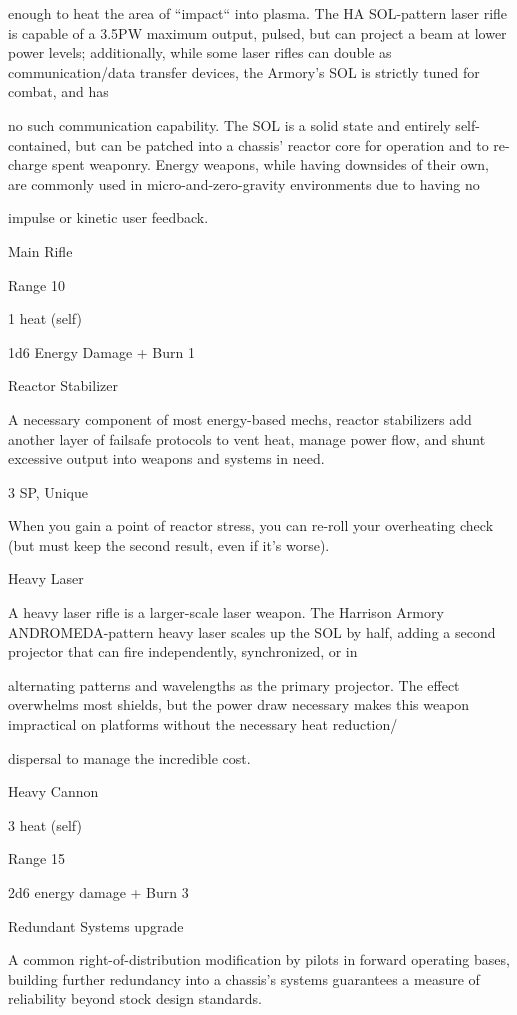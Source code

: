 enough to heat the area of ``impact`` into plasma. The HA SOL-pattern laser rifle is capable of a 3.5PW
maximum output, pulsed, but can project a beam at lower power levels; additionally, while some laser rifles
can double as communication/data transfer devices, the Armory's SOL is strictly tuned for combat, and has

no such communication capability. The SOL is a solid state and entirely self-contained, but can be patched
into a chassis' reactor core for operation and to re-charge spent weaponry. Energy weapons, while having
downsides of their own, are commonly used in micro-and-zero-gravity environments due to having no

impulse or kinetic user feedback.

Main Rifle

Range 10

1 heat (self)

1d6 Energy Damage + Burn 1


Reactor Stabilizer

A necessary component of most energy-based mechs, reactor stabilizers add another layer of failsafe
protocols to vent heat, manage power flow, and shunt excessive output into weapons and systems in need.

3 SP, Unique




When you gain a point of reactor stress, you can re-roll your overheating check (but must keep
the second result, even if it’s worse).


Heavy Laser

A heavy laser rifle is a larger-scale laser weapon. The Harrison Armory ANDROMEDA-pattern heavy laser
scales up the SOL by half, adding a second projector that can fire independently, synchronized, or in

alternating patterns and wavelengths as the primary projector. The effect overwhelms most shields, but the
power draw necessary makes this weapon impractical on platforms without the necessary heat reduction/

dispersal to manage the incredible cost.

Heavy Cannon

3 heat (self)

Range 15

2d6 energy damage + Burn 3


Redundant Systems upgrade

A common right-of-distribution modification by pilots in forward operating bases, building further
redundancy into a chassis's systems guarantees a measure of reliability beyond stock design standards.

